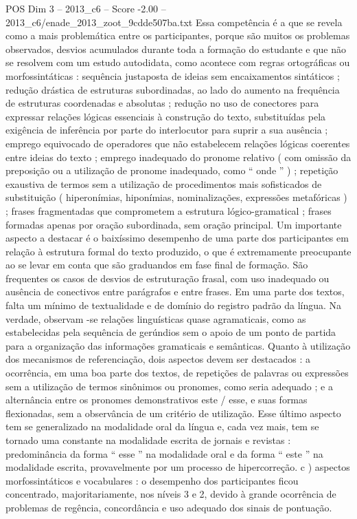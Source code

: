 \begin{textsample}{POS Dim 3 – 2013\_c6 – Score -2.00 – 2013\_c6/enade\_2013\_zoot\_9cdde507ba.txt}
Essa competência é a que se revela como a mais problemática entre os participantes, porque são muitos os problemas observados, desvios acumulados durante toda a formação do estudante e que não se resolvem com um estudo autodidata, como acontece com regras ortográficas ou morfossintáticas : sequência justaposta de ideias sem encaixamentos sintáticos ; redução drástica de estruturas subordinadas, ao lado do aumento na frequência de estruturas coordenadas e absolutas ; redução no uso de conectores para expressar relações lógicas essenciais à construção do texto, substituídas pela exigência de inferência por parte do interlocutor para suprir a sua ausência ; emprego equivocado de operadores que não estabelecem relações lógicas coerentes entre ideias do texto ; emprego inadequado do pronome relativo ( com omissão da preposição ou a utilização de pronome inadequado, como “ onde ” ) ; repetição exaustiva de termos sem a utilização de procedimentos mais sofisticados de substituição ( hiperonímias, hiponímias, nominalizações, expressões metafóricas ) ; frases fragmentadas que comprometem a estrutura lógico-gramatical ; frases formadas apenas por oração subordinada, sem oração principal.
Um importante aspecto a destacar é o baixíssimo desempenho de uma parte dos participantes em relação à estrutura formal do texto produzido, o que é extremamente preocupante ao se levar em conta que são graduandos em fase final de formação.
São frequentes os casos de desvios de estruturação frasal, com uso inadequado ou ausência de conectivos entre parágrafos e entre frases.
Em uma parte dos textos, falta um mínimo de textualidade e de domínio do registro padrão da língua.
Na verdade, observam -se relações linguísticas quase agramaticais, como as estabelecidas pela sequência de gerúndios sem o apoio de um ponto de partida para a organização das informações gramaticais e semânticas.
Quanto à utilização dos mecanismos de referenciação, dois aspectos devem ser destacados : a ocorrência, em uma boa parte dos textos, de repetições de palavras ou expressões sem a utilização de termos sinônimos ou pronomes, como seria adequado ; e a alternância entre os pronomes demonstrativos este / esse, e suas formas flexionadas, sem a observância de um critério de utilização.
Esse último aspecto tem se generalizado na modalidade oral da língua e, cada vez mais, tem se tornado uma constante na modalidade escrita de jornais e revistas : predominância da forma “ esse ” na modalidade oral e da forma “ este ” na modalidade escrita, provavelmente por um processo de hipercorreção. c ) aspectos morfossintáticos e vocabulares : o desempenho dos participantes ficou concentrado, majoritariamente, nos níveis 3 e 2, devido à grande ocorrência de problemas de regência, concordância e uso adequado dos sinais de pontuação.

\end{textsample}
